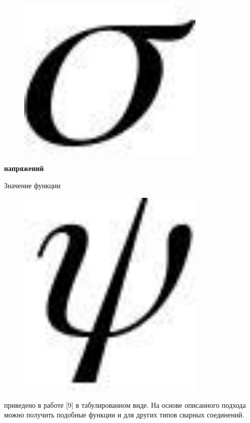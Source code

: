 \begin{figure}[H]
	\centering
	\includegraphics[width=0.8\textwidth]{assets/1240}
	\caption*{}
\end{figure} {\bfseries напряжений}

Значение функции \begin{figure}[H]
	\centering
	\includegraphics[width=0.8\textwidth]{assets/1241}
	\caption*{}
\end{figure} приведено в работе
{[}9{]} в табулированном виде. На основе описанного подхода можно
получить подобные функции и для других типов сварных соединений.

